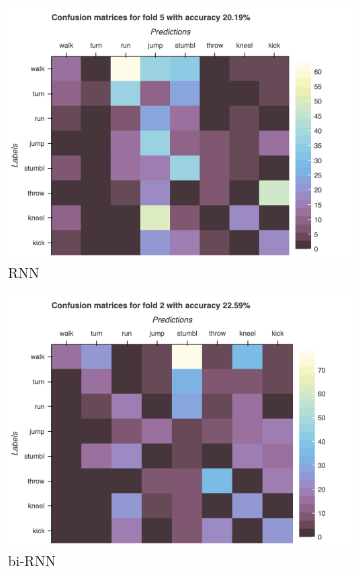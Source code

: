 		\begin{figure}[H]
			\centering
			\begin{subfigure}[b]{0.49\textwidth}
				\centering
				\includegraphics[width=\textwidth]{img/RNN-confusion_matrix_drop.png}
				\caption{RNN}
			\end{subfigure}
			\hfill
			\begin{subfigure}[b]{0.49\textwidth}
				\centering
				\includegraphics[width=\textwidth]{img/bi-RNN-Confusion_matrix_drop.png}
				\caption{bi-RNN}
			\end{subfigure}
			\hfill
			\begin{subfigure}[b]{0.49\textwidth}
				\centering

\end{subfigure}
\end{figure}

